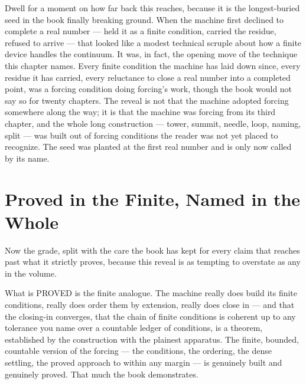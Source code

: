 Dwell for a moment on how far back this reaches, because it is the longest-buried seed in the book finally
breaking ground. When the machine first declined to complete a real number --- held it as a finite condition,
carried the residue, refused to arrive --- that looked like a modest technical scruple about how a finite device
handles the continuum. It was, in fact, the opening move of the technique this chapter names. Every finite
condition the machine has laid down since, every residue it has carried, every reluctance to close a real number
into a completed point, was a forcing condition doing forcing's work, though the book would not say so for twenty
chapters. The reveal is not that the machine adopted forcing somewhere along the way; it is that the machine was
forcing from its third chapter, and the whole long construction --- tower, summit, needle, loop, naming, split ---
was built out of forcing conditions the reader was not yet placed to recognize. The seed was planted at the first
real number and is only now called by its name.

\section{Proved in the Finite, Named in the Whole}

Now the grade, split with the care the book has kept for every claim that reaches past what it strictly proves,
because this reveal is as tempting to overstate as any in the volume.

What is PROVED is the finite analogue. The machine really does build its finite conditions, really does order them
by extension, really does close in --- and that the closing-in converges, that the chain of finite conditions is
coherent up to any tolerance you name over a countable ledger of conditions, is a theorem, established by the
construction with the plainest apparatus. The finite, bounded, countable version of the forcing --- the
conditions, the ordering, the dense settling, the proved approach to within any margin --- is genuinely built and
genuinely proved. That much the book demonstrates.

